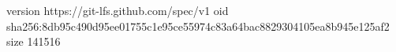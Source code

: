 version https://git-lfs.github.com/spec/v1
oid sha256:8db95c490d95ee01755c1e95ce55974c83a64bac8829304105ea8b945e125af2
size 141516
